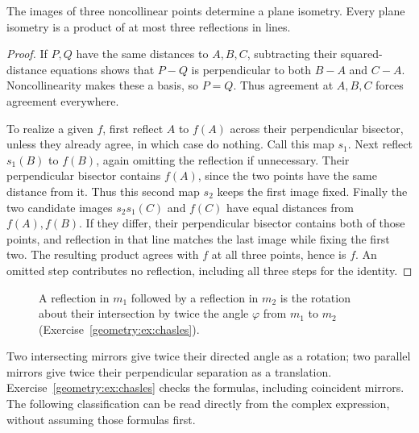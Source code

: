 \begin{theorem}\label{geometry:thm:threereflections}
The images of three noncollinear points determine a plane isometry. Every plane isometry is a product of at most three reflections in lines.
\end{theorem}
\begin{proof}
If $P,Q$ have the same distances to $A,B,C$, subtracting their squared-distance equations shows that $P-Q$ is perpendicular to both $B-A$ and $C-A$. Noncollinearity makes these a basis, so $P=Q$. Thus agreement at $A,B,C$ forces agreement everywhere.

To realize a given $f$, first reflect $A$ to $f(A)$ across their perpendicular bisector, unless they already agree, in which case do nothing. Call this map $s_1$. Next reflect $s_1(B)$ to $f(B)$, again omitting the reflection if unnecessary. Their perpendicular bisector contains $f(A)$, since the two points have the same distance from it. Thus this second map $s_2$ keeps the first image fixed. Finally the two candidate images $s_2s_1(C)$ and $f(C)$ have equal distances from $f(A),f(B)$. If they differ, their perpendicular bisector contains both of those points, and reflection in that line matches the last image while fixing the first two. The resulting product agrees with $f$ at all three points, hence is $f$. An omitted step contributes no reflection, including all three steps for the identity.
\end{proof}

\begin{figure}[ht]
\centering
{}
\caption{A reflection in $m_1$ followed by a reflection in $m_2$ is the rotation about their intersection by twice the angle
$\varphi$ from $m_1$ to $m_2$ (Exercise~\ref{geometry:ex:chasles}).}
\label{geometry:fig:tworeflections}
\end{figure}

Two intersecting mirrors give twice their directed angle as a rotation; two parallel mirrors give twice their perpendicular separation as a translation. Exercise~\ref{geometry:ex:chasles} checks the formulas, including coincident mirrors. The following classification can be read directly from the complex expression, without assuming those formulas first.

